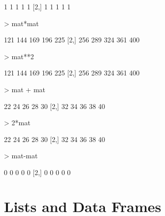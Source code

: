 \documentclass[12pt]{article}
\begin{document}
\begin{Schunk}
\begin{Soutput}
     [,1] [,2] [,3] [,4] [,5]
[1,]    1    1    1    1    1
[2,]    1    1    1    1    1
\end{Soutput}
\begin{Sinput}
> mat*mat
\end{Sinput}
\begin{Soutput}
     [,1] [,2] [,3] [,4] [,5]
[1,]  121  144  169  196  225
[2,]  256  289  324  361  400
\end{Soutput}
\begin{Sinput}
> mat**2
\end{Sinput}
\begin{Soutput}
     [,1] [,2] [,3] [,4] [,5]
[1,]  121  144  169  196  225
[2,]  256  289  324  361  400
\end{Soutput}
\begin{Sinput}
> mat + mat
\end{Sinput}
\begin{Soutput}
     [,1] [,2] [,3] [,4] [,5]
[1,]   22   24   26   28   30
[2,]   32   34   36   38   40
\end{Soutput}
\begin{Sinput}
> 2*mat
\end{Sinput}
\begin{Soutput}
     [,1] [,2] [,3] [,4] [,5]
[1,]   22   24   26   28   30
[2,]   32   34   36   38   40
\end{Soutput}
\begin{Sinput}
> mat-mat
\end{Sinput}
\begin{Soutput}
     [,1] [,2] [,3] [,4] [,5]
[1,]    0    0    0    0    0
[2,]    0    0    0    0    0
\end{Soutput}
\end{Schunk}

\section{Lists and Data Frames}
\end{document}
